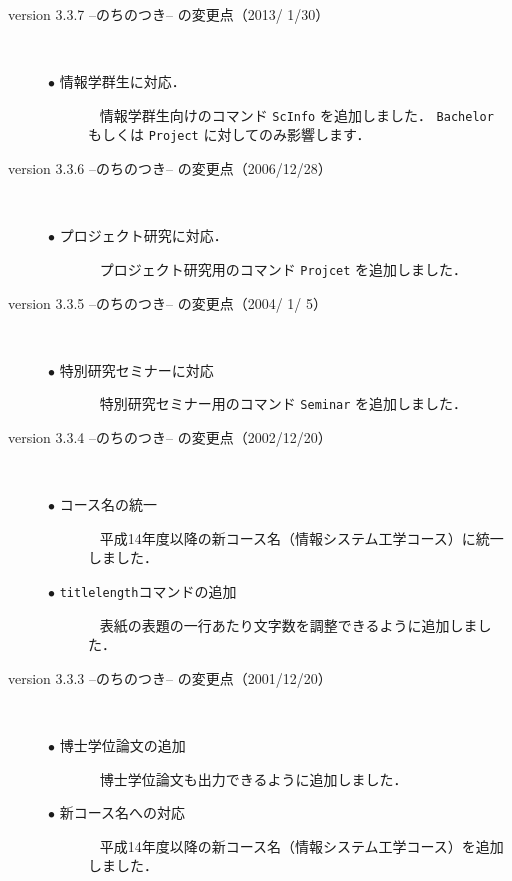 \documentclass[mingoth]{kut-paper}		%
\begin{document}
\begin{description}
 \tiny
 \item[version 3.3.7 --のちのつき-- の変更点（2013/ 1/30）]~
 \begin{description}
  \item[$\bullet$ 情報学群生に対応．]~
			 情報学群生向けのコマンド \texttt{ScInfo} を追加しました．
                         \texttt{Bachelor} もしくは \texttt{Project} に対してのみ影響します．
 \end{description}

 \item[version 3.3.6 --のちのつき-- の変更点（2006/12/28）]~
 \begin{description}
  \item[$\bullet$ プロジェクト研究に対応．]~
			 プロジェクト研究用のコマンド \texttt{Projcet} を追加しました．
 \end{description}

 \item[version 3.3.5 --のちのつき-- の変更点（2004/ 1/ 5）]~
 \begin{description}
  \item[$\bullet$ 特別研究セミナーに対応]~
			 特別研究セミナー用のコマンド \texttt{Seminar} を追加しました．
 \end{description}

 \item[version 3.3.4 --のちのつき-- の変更点（2002/12/20）]~
 \begin{description}
  \item[$\bullet$ コース名の統一]~
			 平成14年度以降の新コース名（情報システム工学コース）に統一しました．
 \end{description}
 \begin{description}
  \item[$\bullet$ \texttt{titlelength}コマンドの追加]~
                         表紙の表題の一行あたり文字数を調整できるように追加しました．
 \end{description}
			
 \item[version 3.3.3 --のちのつき-- の変更点（2001/12/20）]~
 \begin{description}
  \item[$\bullet$ 博士学位論文の追加]~
			 博士学位論文も出力できるように追加しました．
  \item[$\bullet$ 新コース名への対応]~
			 平成14年度以降の新コース名（情報システム工学コース）を追加しました．
 \end{description}
			

\end{description}
\end{document}

